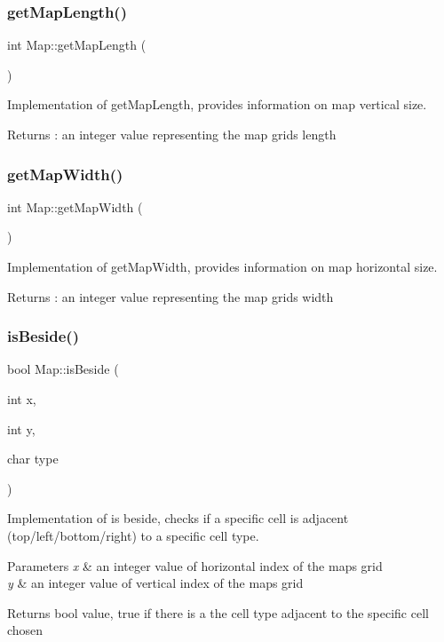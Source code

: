 \subsubsection{\texorpdfstring{get\+Map\+Length()}{getMapLength()}}
{\footnotesize\ttfamily int Map\+::get\+Map\+Length (\begin{DoxyParamCaption}{ }\end{DoxyParamCaption})}

Implementation of get\+Map\+Length, provides information on map vertical size. \begin{DoxyReturn}{Returns}
\+: an integer value representing the map grid\textquotesingle{}s length 
\end{DoxyReturn}
\hypertarget{classMap_a286853d8475bc1bbede582c89e9b1491}{}\label{classMap_a286853d8475bc1bbede582c89e9b1491} 
\subsubsection{\texorpdfstring{get\+Map\+Width()}{getMapWidth()}}
{\footnotesize\ttfamily int Map\+::get\+Map\+Width (\begin{DoxyParamCaption}{ }\end{DoxyParamCaption})}

Implementation of get\+Map\+Width, provides information on map horizontal size. \begin{DoxyReturn}{Returns}
\+: an integer value representing the map grid\textquotesingle{}s width 
\end{DoxyReturn}
\hypertarget{classMap_a7ba2837b589493924b726dc326d68e8e}{}\label{classMap_a7ba2837b589493924b726dc326d68e8e} 
\subsubsection{\texorpdfstring{is\+Beside()}{isBeside()}}
{\footnotesize\ttfamily bool Map\+::is\+Beside (\begin{DoxyParamCaption}\item[{int}]{x,  }\item[{int}]{y,  }\item[{char}]{type }\end{DoxyParamCaption})}

Implementation of is beside, checks if a specific cell is adjacent (top/left/bottom/right) to a specific cell type. 
\begin{DoxyParams}{Parameters}
{\em x} & an integer value of horizontal index of the map\textquotesingle{}s grid \\
\hline
{\em y} & an integer value of vertical index of the map\textquotesingle{}s grid \\
\hline
\end{DoxyParams}
\begin{DoxyReturn}{Returns}
bool value, true if there is a the cell type adjacent to the specific cell chosen 
\end{DoxyReturn}
\hypertarget{classMap_a79e5ced99d160ca9b680661169f16d84}{}\label{classMap_a79e5ced99d160ca9b680661169f16d84} 
